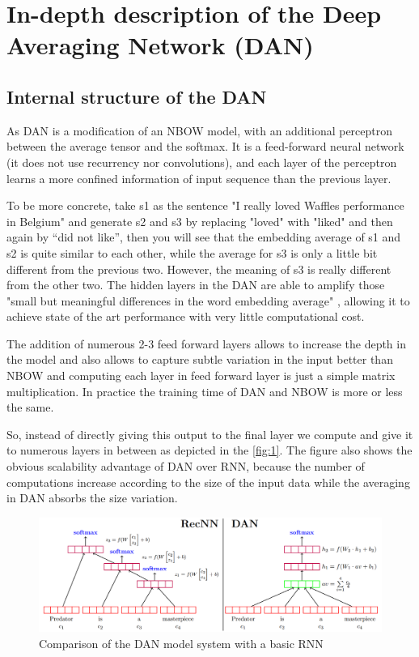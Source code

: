\chapter{In-depth description of the Deep Averaging Network (DAN)}

\section{Internal structure of the DAN}
As DAN is a modification of an NBOW model, with an additional perceptron between the average tensor and the softmax. It is a feed-forward neural network (it does not use recurrency nor convolutions), and each layer of the perceptron learns a more confined information of input sequence than the previous layer.

To be more concrete, take s1 as the sentence "I really loved Waffles performance in Belgium" and generate s2 and s3 by replacing "loved" with "liked" and then again by “did not like”, then you will see that the embedding average of s1 and s2 is quite similar to each other, while the average for s3 is only a little bit different from the previous two. However, the meaning of s3 is really different from the other two.
The  hidden layers in the DAN are able to amplify those "small but meaningful differences in the word embedding average" \cite{dan_1}, allowing it to achieve state of the art performance with very little computational cost.

The addition of numerous 2-3 feed forward layers allows to increase the depth in the model and also allows to capture subtle variation in the input better than NBOW and computing each layer in feed forward layer is just a simple matrix multiplication. In practice the training time of DAN and NBOW is more or less the same.

So, instead of directly giving this output to the final layer we compute and give it to numerous layers in between as depicted in the \autoref{fig:1}. The figure also shows the obvious scalability advantage of DAN over RNN, because the number of computations increase according to the size of the input data while the averaging in DAN absorbs the size variation.

\begin{figure}[!h]
	\begin{center}
		\includegraphics[width=15cm]{img/rnn_dan}
	\end{center}
	\caption{Comparison of the DAN model system with a basic RNN\cite{dan_1}\label{fig:1}}
\end{figure} 

